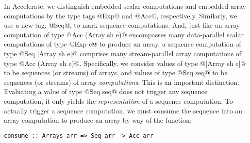 %
%
%


In Accelerate, we distinguish embedded scalar computations and embedded array computations by the type tags @Exp@ and @Acc@, respectively. Similarly, we use a new tag, @Seq@, to mark sequence computations. And, just like an array computation of type @Acc (Array sh e)@ encompasses many data-parallel scalar computations of type @Exp e@ to produce an array, a sequence computation of type @Seq [Array sh e]@ comprises many stream-parallel array computations of type @Acc (Array sh e)@. Specifically, we consider values of type @[Array sh e]@ to be sequences (or streams) of arrays, and values of type @Seq seq@ to be sequences (or streams) of array \emph{computations}. This is an important distinction. Evaluating a value of type @Seq seq@ does not trigger any sequence computation, it only yields the \emph{representation} of a sequence computation. To actually trigger a sequence computation, we must consume the sequence into an array computation to produce an array by way of the function:
%
\begin{lstlisting}
consume :: Arrays arr => Seq arr -> Acc arr
\end{lstlisting}


